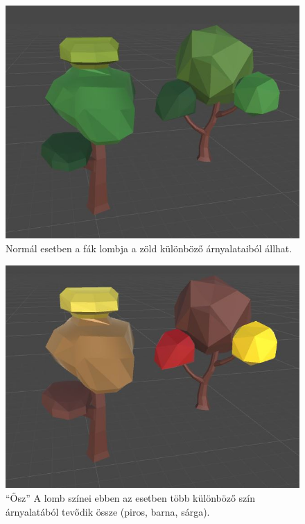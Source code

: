 \begin{figure}[h!]
\centering
\includegraphics[scale=0.32]{kepek/Tree_Normal.JPG}
\caption[normal]{Normál esetben a fák lombja a zöld különböző árnyalataiból állhat. \footnotemark}
\label{fig:Tree_Normal}
\end{figure}


\begin{figure}[h!]
\centering
\includegraphics[scale=0.32]{kepek/Tree_Fall.JPG}
\caption[Ősz]{“Ősz” A lomb színei ebben az esetben több különböző szín árnyalatából tevődik össze (piros, barna, sárga). \footnotemark}
\label{fig:Tree_Fall}
\end{figure}

